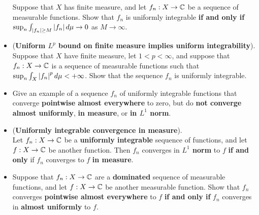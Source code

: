 \documentclass[11pt]{article}
\begin{document}
\begin{itemize}
\begin{remark}
\begin{exercise}
Suppose that $X$ has finite measure, and let $f_n : X \rightarrow {\mathbb C}$ be a sequence of measurable functions. Show that $f_n$ is uniformly
integrable \textbf{if and only if} $\sup_{n}\int_{\left\lvert f_n \right\rvert \ge M} \left\lvert f_n \right\rvert d\mu \rightarrow 0$ as $M \rightarrow \infty$.
\end{exercise}
\end{remark}

\item \begin{exercise} (\textbf{Uniform $L^p$ bound on finite measure implies uniform integrability}). \\
Suppose that $X$ have finite measure, let $1 < p < \infty$, and suppose that $f_n : X \rightarrow {\mathbb C}$ is a sequence of measurable functions such that $\sup_{n}\int_X \left\lvert f_n \right\rvert^{p} d\mu < +\infty$. Show that the sequence $f_n$ is uniformly integrable.
\end{exercise}

\item \begin{exercise}
Give an example of a sequence $f_n$ of uniformly integrable functions that converge \textbf{pointwise almost everywhere} to
zero, but do \textbf{not converge} \textbf{almost uniformly}, \textbf{in measure}, or \textbf{in $L^1$ norm}.
\end{exercise}

\item \begin{theorem} (\textbf{Uniformly integrable convergence in measure}).\\
Let $f_n : X \rightarrow {\mathbb C}$ be a \textbf{uniformly integrable} sequence of functions, and let $f : X \rightarrow {\mathbb C}$ be another function. Then $f_n$ converges in \textbf{$L^1$ norm} to $f$ \textbf{if and only} if $f_n$ converges to $f$ \textbf{in measure}.
\end{theorem}

\item \begin{proposition}
Suppose that $f_n : X \rightarrow {\mathbb C}$ are a \textbf{dominated} sequence of measurable functions, and let $f : X \rightarrow {\mathbb C}$  be another measurable function. Show that $f_n$ converges \textbf{pointwise almost everywhere} to $f$ \textbf{if and only if} $f_n$ converges in \textbf{almost uniformly} to $f$.
\end{proposition}
\end{itemize}
\end{document}
